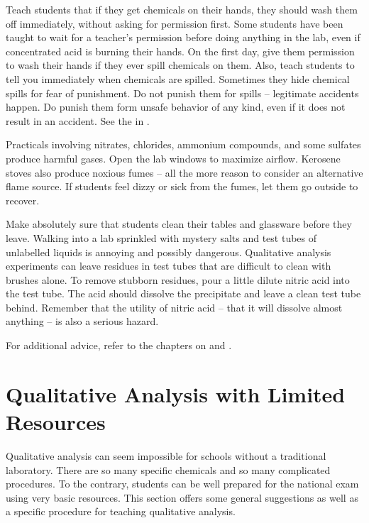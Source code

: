 Teach students that if they get chemicals on their hands, 
they should wash them off immediately, 
without asking for permission first. 
Some students have been taught to wait for a teacher's permission 
before doing anything in the lab, 
even if concentrated acid is burning their hands. 
On the first day, 
give them permission to wash their hands 
if they ever spill chemicals on them. 
Also, 
teach students to tell you immediately when chemicals are spilled. 
Sometimes they hide chemical spills for fear of punishment. 
Do not punish them for spills -- legitimate accidents happen. 
Do punish them form unsafe behavior of any kind, 
even if it does not result in an accident. 
See the  in .

Practicals involving nitrates, 
chlorides, 
ammonium compounds, 
and some sulfates produce harmful gases. 
Open the lab windows to maximize airflow. 
Kerosene stoves also produce noxious fumes -- 
all the more reason to consider an alternative flame source. 
If students feel dizzy or sick from the fumes, 
let them go outside to recover.

Make absolutely sure that students clean their tables 
and glassware before they leave. 
Walking into a lab sprinkled with mystery salts 
and test tubes of unlabelled liquids is annoying and possibly dangerous. 
Qualitative analysis experiments can leave residues in test tubes 
that are difficult to clean with brushes alone. 
To remove stubborn residues, 
pour a little dilute nitric acid into the test tube. 
The acid should dissolve the precipitate 
and leave a clean test tube behind. 
Remember that the utility of nitric acid -- 
that it will dissolve almost anything -- is also a serious hazard.

For additional advice, 
refer to the chapters on  and .

\section{Qualitative Analysis with Limited Resources}

Qualitative analysis can seem impossible for schools 
without a traditional laboratory. 
There are so many specific chemicals 
and so many complicated procedures. 
To the contrary, 
students can be well prepared for the national exam 
using very basic resources. 
This section offers some general suggestions as well as 
a specific procedure for teaching qualitative analysis.

